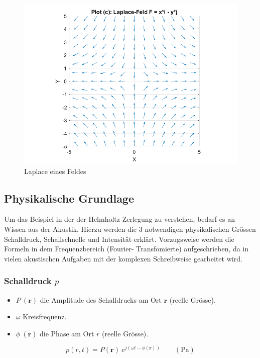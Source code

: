 \begin{figure}[h!]
	\centering
	\includegraphics[scale=0.4]{papers/helmholtz/images/Laplace_Feld.png}
	\caption{Laplace eines Feldes}
	\label{fig:LaplaceAlg}
\end{figure}


\subsection{Physikalische Grundlage}

Um das Beispiel in der der Helmholtz-Zerlegung zu verstehen, bedarf es an Wissen aus der Akustik. Hierzu werden die 3 notwendigen physikalischen Grössen Schalldruck, Schallschnelle und Intensität erklärt. Vorzugsweise werden die Formeln in dem Frequenzbereich (Fourier- Transfomierte) aufgeschrieben, da in vielen akustischen Aufgaben mit der komplexen Schreibweise gearbeitet wird.


\subsubsection{Schalldruck $p$}
\begin{itemize}
\item $P \: (\mathbf{r})$ die Amplitude des Schalldrucks am Ort $\mathbf{r}$ (reelle Grösse).
\item $\omega$ Kreisfrequenz.
\item $\phi \: (\mathbf{r})$ die Phase am Ort $r$ (reelle Grösse).
\end{itemize}

\begin{equation}
p(r,t) = P(\mathbf{r}) \: e^{j( \omega t - \phi(\mathbf{r}))} \qquad (\si{\pascal})
\end{equation}

